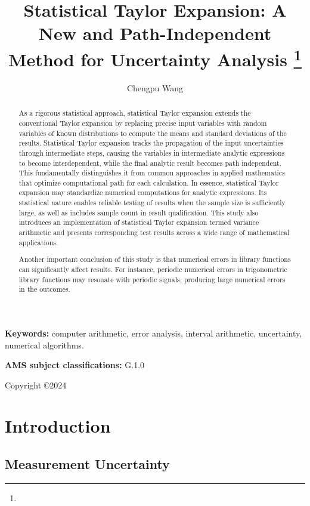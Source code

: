 \documentclass[twoside]{article}
\title{Statistical Taylor Expansion: A New and Path-Independent Method for Uncertainty Analysis \footnote{\whenaccepted}}
\author{Chengpu Wang
\institution{40 Grossman Street, Melville, NY 11747, USA}
\email{Chengpu@gmail.com}}
\numberwithin{equation}{section}
\newcommand{\keywords}[1]{\small\textbf{Keywords: }#1}
\newcommand{\AMSsubj}[1]{\noindent\textbf{AMS subject classifications: }#1}
\newcommand{\Verbose}{}
\begin{document}
\maketitle
\begin{abstract}

As a rigorous statistical approach, statistical Taylor expansion extends the conventional Taylor expansion by replacing precise input variables with random variables of known distributions to compute the means and standard deviations of the results.
Statistical Taylor expansion tracks the propagation of the input uncertainties through intermediate steps, causing the variables in intermediate analytic expressions to become interdependent, while the final analytic result becomes path independent.
This fundamentally distinguishes it from common approaches in applied mathematics that optimize computational path for each calculation.
In essence, statistical Taylor expansion may standardize numerical computations for analytic expressions.
Its statistical nature enables reliable testing of results when the sample size is sufficiently large, as well as includes sample count in result qualification.
This study also introduces an implementation of statistical Taylor expansion termed variance arithmetic and presents corresponding test results across a wide range of mathematical applications.

Another important conclusion of this study is that numerical errors in library functions can significantly affect results.  
For instance, periodic numerical errors in trigonometric library functions may resonate with periodic signals, producing large numerical errors in the outcomes.
\end{abstract}

\keywords{computer arithmetic, error analysis, interval arithmetic, uncertainty, numerical algorithms.}

\AMSsubj{G.1.0}

Copyright \copyright{2024}


\ifdefined\Verbose
\clearpage
\tableofcontents
\fi
\clearpage
\section{Introduction}
\label{sec: introduction}

\subsection{Measurement Uncertainty}
\end{document}
